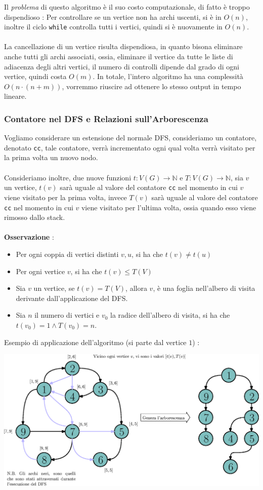 \documentclass[12pt, letterpaper]{article}
\newcommand{\code}[1]{\colorbox{light-gray}{\texttt{#1}}}
\newcommand{\acc}{\\\hphantom{}\\}
\begin{document}
Il \textit{problema} di questo algoritmo è il suo costo computazionale, di fatto è troppo dispendioso : Per
controllare se un vertice non ha archi uscenti, si è in \(O(n)\), inoltre il ciclo \code{while} controlla
tutti i vertici, quindi si è nuovamente in \(O(n)\).    \acc  La cancellazione di un vertice risulta dispendiosa, in
quanto bisona eliminare anche tutti gli archi associati, ossia, eliminare il vertice da tutte le liste
di adiacenza degli altri vertici, il numero di controlli dipende dal grado di ogni vertice,
quindi costa \(O(m)\). In totale, l'intero algoritmo ha una complessità \(O(n\cdot(n+m))\), vorremmo riuscire
ad ottenere lo stesso output in tempo lineare.
\subsubsection{Contatore nel DFS e Relazioni sull'Arborescenza}
Vogliamo considerare un estensione del normale DFS, consideriamo un contatore, denotato \code{cc}, tale contatore,
verrà incrementato ogni qual volta verrà visitato per la prima volta un nuovo nodo.\acc Consideriamo inoltre, due nuove
funzioni \(t:V(G)\rightarrow\mathbb{N}\) e \(T:V(G)\rightarrow\mathbb{N}\), sia \(v\) un vertice, \(t(v)\) sarà uguale al valore
del contatore \code{cc} nel momento in cui \(v\) viene visitato per la prima volta, invece \(T(v)\) sarà uguale al valore
del contatore \code{cc} nel momento in cui \(v\) viene visitato per l'ultima volta, ossia quando esso viene rimosso dallo stack.\acc
\textbf{Osservazione} : \begin{itemize}
    \item Per ogni coppia di vertici distinti \(v,u\), si ha che \(t(v)\ne t(u)\)
    \item Per ogni vertice \(v\), si ha che \(t(v)\le T(V)\)
    \item Sia \(v\) un vertice, se \(t(v)=T(V)\), allora \(v\), è una foglia nell'albero di visita derivante dall'applicazione
          del DFS.
    \item Sia \(n\) il numero di vertici e \(v_0\) la radice dell'albero di visita, si ha che \(t(v_0)=1\land T(v_0)=n\).
\end{itemize}
Esempio di applicazione dell'algoritmo (si parte dal vertice \(1\)) : \begin{center}
    \includegraphics[width=1.05\textwidth ]{images/dfsContatore.eps}
\end{center}
\end{document}
